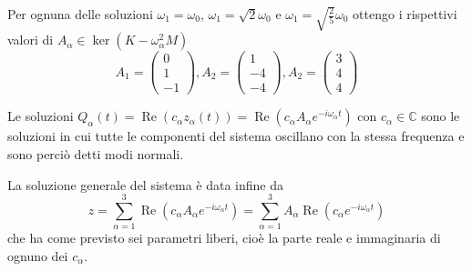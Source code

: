 \documentclass[../main.tex]{subfiles}
\begin{document}
Per ognuna delle soluzioni $\omega_1=\omega_0$, $\omega_1=\sqrt{2}\omega_0$ e $\omega_1=\sqrt{\frac 25}\omega_0$ ottengo i rispettivi valori di $A_\alpha\in \ker (K-\omega_\alpha^2M)$
\begin{equation*}
	A_1=\begin{pmatrix}
	    	0\\
	    	1\\
	    	-1
	    \end{pmatrix},
	A_2=\begin{pmatrix}
	    	1\\
	    	-4\\
	    	-4
	    \end{pmatrix},
	A_2=\begin{pmatrix}
	    	3\\
	    	4\\
	    	4
	    \end{pmatrix}
\end{equation*}

Le soluzioni $Q_\alpha(t)=\operatorname{Re}(c_\alpha z_\alpha(t))=\operatorname{Re}(c_\alpha A_\alpha e^{-i\omega_\alpha t})$ con $c_\alpha\in \mathbb{C}$ sono le soluzioni in cui tutte le componenti del sistema oscillano con la stessa frequenza e sono perciò detti modi normali.

La soluzione generale del sistema è data infine da
\begin{equation*}
	z=\sum_{\alpha=1}^{3}\operatorname{Re}(c_\alpha A_\alpha e^{-i\omega_\alpha t})=\sum_{\alpha=1}^{3} A_\alpha \operatorname{Re}(c_\alpha e^{-i\omega_\alpha t})
\end{equation*}
che ha come previsto sei parametri liberi, cioè la parte reale e immaginaria di ognuno dei $c_\alpha$.
\end{document}
